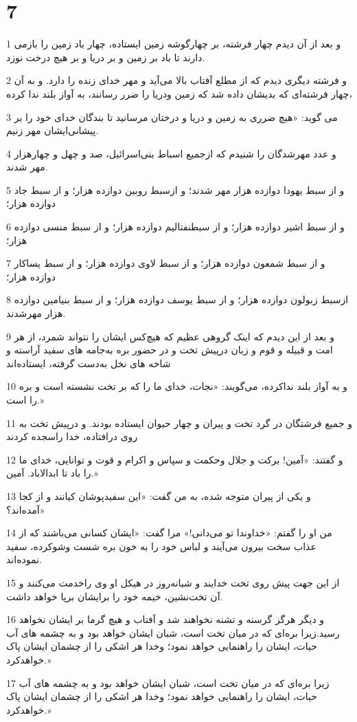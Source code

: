 \chapter{7}

\par 1 و بعد از آن دیدم چهار فرشته، بر چهارگوشه زمین ایستاده، چهار باد زمین را بازمی دارند تا باد بر زمین و بر دریا و بر هیچ درخت نوزد.
\par 2 و فرشته دیگری دیدم که از مطلع آفتاب بالا می‌آید و مهر خدای زنده را دارد. و به آن چهار فرشته‌ای که بدیشان داده شد که زمین ودریا را ضرر رسانند، به آواز بلند ندا کرده،
\par 3 می گوید: «هیچ ضرری به زمین و دریا و درختان مرسانید تا بندگان خدای خود را بر پیشانی‌ایشان مهر زنیم.
\par 4 و عدد مهرشدگان را شنیدم که ازجمیع اسباط بنی‌اسرائیل، صد و چهل و چهارهزار مهر شدند.
\par 5 و از سبط یهودا دوازده هزار مهر شدند؛ و ازسبط روبین دوازده هزار؛ و از سبط جاد دوازده هزار؛
\par 6 و از سبط اشیر دوازده هزار؛ و از سبطنفتالیم دوازده هزار؛ و از سبط منسی دوازده هزار؛
\par 7 و از سبط شمعون دوازده هزار؛ و از سبط لاوی دوازده هزار؛ و از سبط یساکار دوازده هزار؛
\par 8 ازسبط زبولون دوازده هزار؛ و از سبط یوسف دوازده هزار؛ و از سبط بنیامین دوازده هزار مهرشدند.
\par 9 و بعد از این دیدم که اینک گروهی عظیم که هیچ‌کس ایشان را نتواند شمرد، از هر امت و قبیله و قوم و زبان در‌پیش تخت و در حضور بره به‌جامه های سفید آراسته و شاخه های نخل به‌دست گرفته، ایستاده‌اند
\par 10 و به آواز بلند نداکرده، می‌گویند: «نجات، خدای ما را که بر تخت نشسته است و بره را است.»
\par 11 و جمیع فرشتگان در گرد تخت و پیران و چهار حیوان ایستاده بودند. و در‌پیش تخت به روی درافتاده، خدا راسجده کردند
\par 12 و گفتند: «آمین! برکت و جلال وحکمت و سپاس و اکرام و قوت و توانایی، خدای ما را باد تا ابدالاباد. آمین.»
\par 13 و یکی از پیران متوجه شده، به من گفت: «این سفیدپوشان کیانند و از کجا آمده‌اند؟»
\par 14 من او را گفتم: «خداوندا تو می‌دانی!» مرا گفت: «ایشان کسانی می‌باشند که از عذاب سخت بیرون می‌آیند و لباس خود را به خون بره شست وشوکرده، سفید نموده‌اند.
\par 15 از این جهت پیش روی تخت خدایند و شبانه‌روز در هیکل او وی راخدمت می‌کنند و آن تخت‌نشین، خیمه خود را برایشان برپا خواهد داشت.
\par 16 و دیگر هرگز گرسنه و تشنه نخواهند شد و آفتاب و هیچ گرما بر ایشان نخواهد رسید.زیرا بره‌ای که در میان تخت است، شبان ایشان خواهد بود و به چشمه های آب حیات، ایشان را راهنمایی خواهد نمود؛ وخدا هر اشکی را از چشمان ایشان پاک خواهدکرد.»
\par 17 زیرا بره‌ای که در میان تخت است، شبان ایشان خواهد بود و به چشمه های آب حیات، ایشان را راهنمایی خواهد نمود؛ وخدا هر اشکی را از چشمان ایشان پاک خواهدکرد.»

